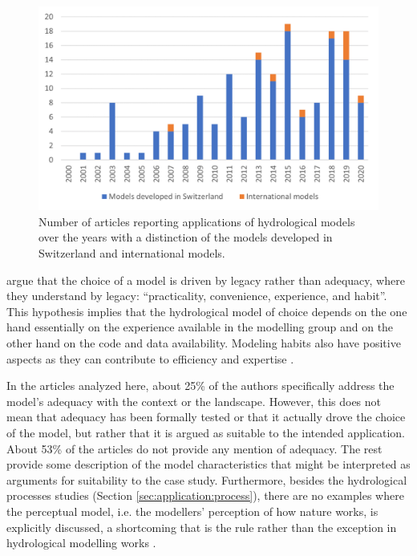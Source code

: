 \documentclass[10pt,a4paper]{article}
\begin{document}
\begin{figure}[htb]
	\begin{center}
		\includegraphics[width=0.70\columnwidth]{figures/histogram.png}
		\caption{{Number of articles reporting applications of hydrological models over the years with a distinction of the models developed in Switzerland and international models. {\label{fig:bars}}
		}}
	\end{center}
\end{figure}

\citet{Addor_2019} argue that the choice of a model is driven by legacy rather than adequacy, where they understand by legacy: ``practicality, convenience, experience, and habit''. This hypothesis implies that the hydrological model of choice depends on the one hand essentially on the experience available in the modelling group and on the other hand on the code and data availability. Modeling habits also have positive aspects as they can contribute to efficiency and expertise \citep{Babel2019}.

In the articles analyzed here, about 25\% of the authors specifically address the model's adequacy with the context or the landscape. However, this does not mean that adequacy has been formally tested or that it actually drove the choice of the model, but rather that it is argued as suitable to the intended application. About 53\% of the articles do not provide any mention of adequacy. The rest provide some description of the model characteristics that might be interpreted as arguments for suitability to the case study. Furthermore, besides the hydrological processes studies (Section \ref{sec:application:process}), there are no examples where the perceptual model, i.e. the modellers' perception of how nature works, is explicitly discussed, a shortcoming that is the rule rather than the exception in hydrological modelling works \citep{beven2021}.
\end{document}
